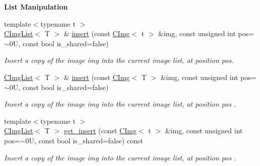 \begin{Indent}\textbf{ List Manipulation}\par
\begin{DoxyCompactItemize}
\item 
{\footnotesize template$<$typename t $>$ }\\\hyperlink{structcimg__library__suffixed_1_1CImgList}{C\+Img\+List}$<$ T $>$ \& \hyperlink{structcimg__library__suffixed_1_1CImgList_a84deef3a7cce5b08836947886ccdffac}{insert} (const \hyperlink{structcimg__library__suffixed_1_1CImg}{C\+Img}$<$ t $>$ \&img, const unsigned int pos=$\sim$0\+U, const bool is\+\_\+shared=false)
\begin{DoxyCompactList}\small\item\em Insert a copy of the image {\ttfamily img} into the current image list, at position {\ttfamily pos}. \end{DoxyCompactList}\item 
\mbox{\label{structcimg__library__suffixed_1_1CImgList_a9a2eec165d8d2df24e4c41e8de5c7169}} 
\hyperlink{structcimg__library__suffixed_1_1CImgList}{C\+Img\+List}$<$ T $>$ \& \hyperlink{structcimg__library__suffixed_1_1CImgList_a9a2eec165d8d2df24e4c41e8de5c7169}{insert} (const \hyperlink{structcimg__library__suffixed_1_1CImg}{C\+Img}$<$ T $>$ \&img, const unsigned int pos=$\sim$0\+U, const bool is\+\_\+shared=false)
\begin{DoxyCompactList}\small\item\em Insert a copy of the image {\ttfamily img} into the current image list, at position {\ttfamily pos} . \end{DoxyCompactList}\item 
\mbox{\label{structcimg__library__suffixed_1_1CImgList_a82ece6eb615fc4667e7f82ee027b89bf}} 
{\footnotesize template$<$typename t $>$ }\\\hyperlink{structcimg__library__suffixed_1_1CImgList}{C\+Img\+List}$<$ T $>$ \hyperlink{structcimg__library__suffixed_1_1CImgList_a82ece6eb615fc4667e7f82ee027b89bf}{get\+\_\+insert} (const \hyperlink{structcimg__library__suffixed_1_1CImg}{C\+Img}$<$ t $>$ \&img, const unsigned int pos=$\sim$0\+U, const bool is\+\_\+shared=false) const
\begin{DoxyCompactList}\small\item\em Insert a copy of the image {\ttfamily img} into the current image list, at position {\ttfamily pos} . \end{DoxyCompactList}\item 

\end{DoxyCompactItemize}
\end{Indent}
